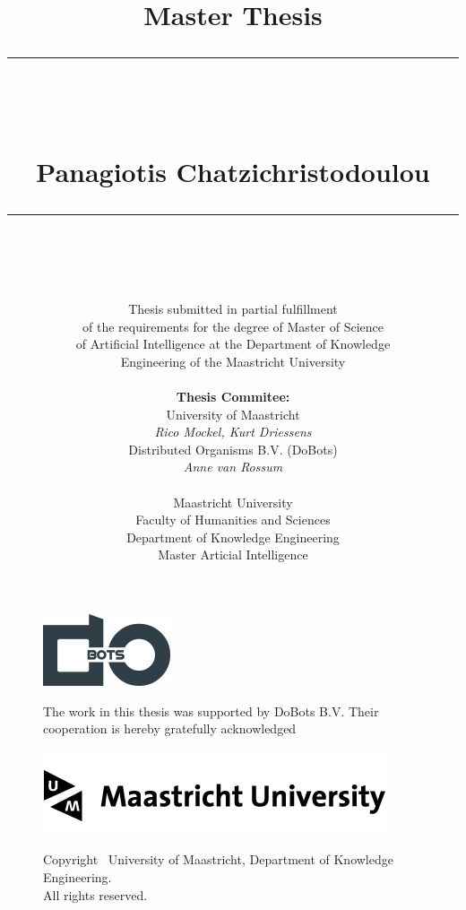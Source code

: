 \documentclass [twoside,hidelinks]{article}
\title{
\Huge{Master Thesis} \\
\noindent\rule{4cm}{0.4pt} \\
\vspace{5mm}
\huge{\selectfont{Towards lifelong mapping in pointclouds}}
\vspace{5mm} \\
\normalsize Panagiotis Chatzichristodoulou \\
\noindent\rule{4cm}{0.4pt} \\
\vspace{5mm}
\fontsize{24pt}{10pt}{Master Thesis DKE 09-16 }} %
\author{
\normalsize Thesis submitted in partial fulfillment\\
\normalsize  of the requirements for the degree of Master of Science \\
\normalsize of Artificial Intelligence at the Department of Knowledge \\
\normalsize  Engineering of the Maastricht University \\
\vspace{5mm} \\
\normalsize \textbf{Thesis Commitee:} \\ 
\normalsize University of Maastricht \\ %
\normalsize \textit{Rico Mockel, Kurt Driessens} \\
\normalsize Distributed Organisms B.V. (DoBots)\\
\normalsize \textit{Anne van Rossum} \\
\vspace{0mm} \\
\normalsize Maastricht University \\
\normalsize Faculty of Humanities and Sciences \\ 
\normalsize Department of Knowledge Engineering \\
\normalsize Master Articial Intelligence \\
}
\begin{document}
\maketitle %

\thispagestyle{fancy} %

\newpage


\begin{flushleft}
    
\begin{figure}[!b]
\centering
\includegraphics[width=.2\textwidth]{logo}
    \label{fig:1}

The work in this thesis was supported by DoBots B.V. Their cooperation is hereby gratefully acknowledged
\end{figure}

\end{flushleft}


\begin{figure}[!b]
\centering
\includegraphics[width=.5\textwidth]{logo-um-black}
    \label{fig:2}

Copyright \textcopyright \ University of Maastricht, Department of Knowledge Engineering. \\
All rights reserved.

\end{figure}
\end{document}
